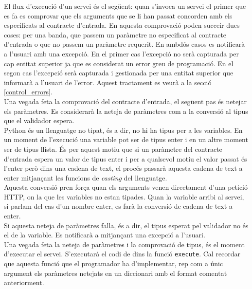 	El flux d'execució d'un servei és el següent: quan s'invoca un servei el primer que es fa es comprovar que els arguments que se li han passat concorden amb els especificats al contracte d'entrada.  En aquesta comprovació poden succeir dues coses: per una banda, que passem un paràmetre no especificat al contracte d'entrada o que no passem un paràmetre requerit. En ambdós casos es notificarà a l'usuari amb una excepció. En el primer cas l'excepció no serà capturada per cap entitat superior ja que es considerat un error greu de programació. En el segon cas l'excepció serà capturada i gestionada per una entitat superior que informarà a l'usuari de l'error. Aquest tractament es veurà a la secció \ref{control_errors}.\\
	
	Una vegada feta la comprovació del contracte d'entrada, el següent pas és netejar els paràmetres. Es considerarà la neteja de paràmetres com a la conversió al tipus que el validador espera.\\
	
	Python és un llenguatge no tipat, és a dir, no hi ha tipus per a les variables. En un moment de l'execució una variable pot ser de tipus enter i en un altre moment ser de tipus llista. És per aquest motiu que si un paràmetre del contracte d'entrada espera un valor de tipus enter i per a qualsevol motiu el valor passat és l'enter però dins una cadena de text, el procés passarà aquesta cadena de text a enter mitjançant les funcions de \emph{casting} del llenguatge.\\
	
	Aquesta conversió pren força quan els arguments venen directament d'una petició \ac{HTTP}, on la que les variables no estan tipades. Quan la variable arribi al servei, si parlam del cas d'un nombre enter, es farà la conversió de cadena de text a enter. \\
	
	Si aquesta neteja de paràmetres falla, és a dir, el tipus esperat pel validador no és el de la variable. Es notificarà a mitjançant una excepció a l'usuari.\\

	Una vegada feta la neteja de paràmetres i la comprovació de tipus, és el moment d'executar el servei. S'executarà el codi de dins la funció \texttt{execute}. Cal recordar que aquesta funció que el programador ha d'implementar, rep com a únic argument els paràmetres netejats en un diccionari amb el format comentat anteriorment.\\
	
